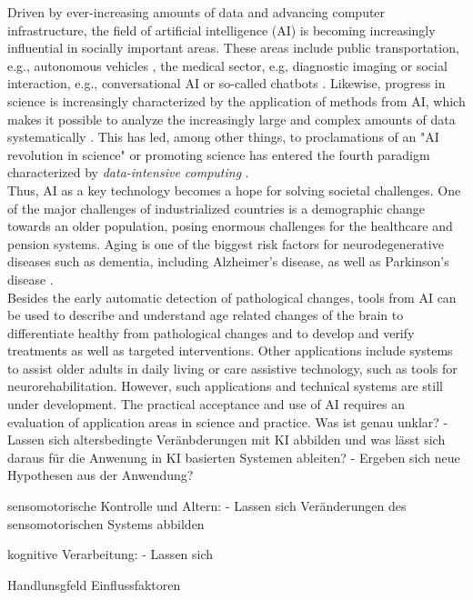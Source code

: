 Driven by ever-increasing amounts of data and advancing computer infrastructure, the field of artificial intelligence (AI) is becoming increasingly influential in socially important areas. These areas include public transportation, e.g., autonomous vehicles \cite{Leonard2020}, the medical sector, e.g, diagnostic imaging \cite{Liu2020} or social interaction, e.g., conversational AI or so-called chatbots \cite{Adamopoulou2020}. Likewise, progress in science is increasingly characterized by the application of methods from AI, which makes it possible to analyze the increasingly large and complex amounts of data systematically \cite{Brunton2019}. This has led, among other things, to proclamations of an "AI revolution in science" \cite{Appenzeller2017} or promoting science has entered the fourth paradigm characterized by \textit{data-intensive computing} \cite{Hey2009}.\\
Thus, AI as a key technology becomes a hope for solving societal challenges. One of the major challenges of industrialized countries is a demographic change towards an older population, posing enormous challenges for the healthcare and pension systems. Aging is one of the biggest risk factors for neurodegenerative diseases such as dementia, including Alzheimer's disease, as well as Parkinson's disease \cite{Hou2019}.\\
Besides the early automatic detection of pathological changes, tools from AI can be used to describe and understand age related changes of the brain to differentiate healthy from pathological changes and to develop and verify treatments as well as targeted interventions. Other applications include systems to assist older adults in daily living or care assistive technology, such as tools for neurorehabilitation. However, such applications and technical systems are still under development. The practical acceptance and use of AI requires an evaluation of application areas in science and practice. 
Was ist genau unklar? 
- Lassen sich altersbedingte Veränbderungen mit KI abbilden und was lässt sich daraus für die Anwenung in KI basierten Systemen ableiten? 
- Ergeben sich neue Hypothesen aus der Anwendung? 


sensomotorische Kontrolle und Altern: 
- Lassen sich Veränderungen des sensomotorischen Systems abbilden 

kognitive Verarbeitung: 
- Lassen sich 

Handlunsgfeld Einflussfaktoren 




